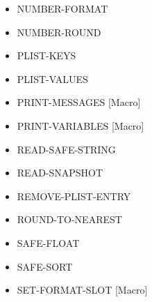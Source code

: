 \documentclass [11pt]{book}
\begin{document}
\begin{itemize}
\item {}NUMBER-FORMAT





\item {}NUMBER-ROUND





\item {}PLIST-KEYS





\item {}PLIST-VALUES





\item {}PRINT-MESSAGES [Macro]





\item {}PRINT-VARIABLES [Macro]





\item {}READ-SAFE-STRING





\item {}READ-SNAPSHOT





\item {}REMOVE-PLIST-ENTRY





\item {}ROUND-TO-NEAREST





\item {}SAFE-FLOAT





\item {}SAFE-SORT





\item {}SET-FORMAT-SLOT [Macro]






\end{itemize}
\end{document}
